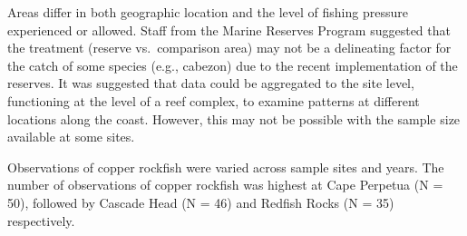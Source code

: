 \documentclass[11pt,
  english,
  a4paper,
]{article}
\begin{document}
\tagmcend\tagstructend


Areas differ in both geographic location and the level of fishing pressure experienced or allowed. Staff from the Marine Reserves Program suggested that the treatment (reserve vs.~comparison area) may not be a delineating factor for the catch of some species (e.g., cabezon) due to the recent implementation of the reserves. It was suggested that data could be aggregated to the site level, functioning at the level of a reef complex, to examine patterns at different locations along the coast. However, this may not be possible with the sample size available at some sites.

\leavevmode\tagmcend\tagstructend\par


Observations of copper rockfish were varied across sample sites and years. The number of observations of copper rockfish was highest at Cape Perpetua (N = 50), followed by Cascade Head (N = 46) and Redfish Rocks (N = 35) respectively.

\leavevmode\tagmcend\tagstructend\par

\begingroup\fontsize{10}{12}\selectfont
\begingroup\fontsize{10}{12}\selectfont
\end{document}
